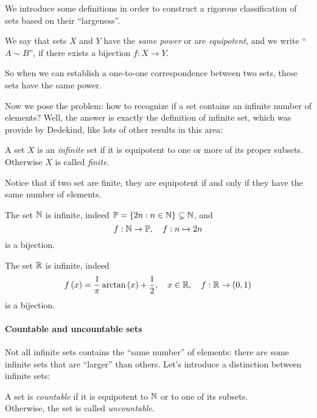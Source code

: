 We introduce some definitions in order to construct a rigorous classification of sets based on their ``largeness''.

\begin{defn}
	We say that sets $X$ and $Y$ have the \emph{same power} or are \emph{equipotent}, and we write ``$A \sim B$'', if there exists a bijection  $f: X\to Y$.
\end{defn}

So when we can establish a one-to-one correspondence between two sets, these sets have the same power.

Now we pose the problem: how to recognize if a set contains an infinite number of elements? Well, the answer is exactly the definition of infinite set, which was provide by Dedekind, like lots of other results in this area:

\begin{defn}[by Dedekind]
	A set $X$ is an \emph{infinite} set if it is equipotent to one or more of its proper subsets. Otherwise $X$ is called \emph{finite}.
\end{defn}

Notice that if two set are finite, they are equipotent if and only if they have the same number of elements.


\begin{exam}
The set $\mathbb N$ is infinite, indeed $\mathbb P=\{2n : n\in \mathbb N\}\subsetneq \mathbb N$, and 
$$
	f:\mathbb N \to \mathbb P,
	\quad f:n \mapsto 2n
$$ 
is a bijection.
\end{exam}
\begin{exam}
The set $\mathbb R$ is infinite, indeed 
$$
	f\left(x\right)
	=\frac 1 \pi \arctan \left(x\right)+\frac 1 2,
	\quad x\in \mathbb R,
	\quad f: \mathbb R \to \left(0,1\right)
$$
is a bijection.
\end{exam}


\paragraph{Countable and uncountable sets}
Not all infinite sets contains the ``same number'' of elements: there are some infinite sets that are ``larger'' than others. Let's introduce a distinction between infinite sets:

\begin{defn}[by Dedekind]
	A set is \emph{countable}\footnotemark{} if it is equipotent to $\mathbb N$ or to one of its subsets.\\ Otherwise, the set is called \emph{uncountable}.
\end{defn}

